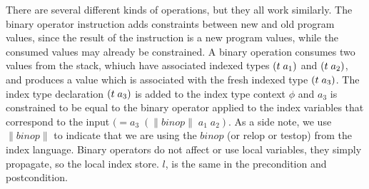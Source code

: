 There are several different kinds of operations, but they all work similarly.
The binary operator instruction adds constraints between new and old program values, since the result of the instruction is a new program values, while the consumed values may already be constrained.
A binary operation consumes two values from the stack, whiuch have associated indexed types $\ti{t}{a_1}$ and $\ti{t}{a_2}$, and produces a value which is associated with the fresh indexed type $\ti{t}{a_3}$.
The index type declaration $\ti{t}{a_3}$ is added to the index type context $\phi$ and $a_3$ is constrained to be equal to the binary operator applied to the index variables that correspond to the input $(= a_3\;(\|binop\|\;a_1\;a_2)$.
As a side note, we use $\|binop\|$ to indicate that we are using the $binop$ (or relop or testop) from the index language.
Binary operators do not affect or use local variables, they simply propagate, so the local index store. $l$, is the same in the precondition and postcondition.
\begin{mathpar}


\end{mathpar}

